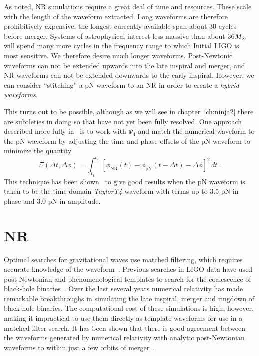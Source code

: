 As noted, NR simulations require a great deal of time and resources.
These scale with the length of the waveform extracted.  Long waveforms
are therefore prohibitively expensive; the longest currently available
span about 30 cycles before merger.  Systems of astrophysical interest
less massive than about $36 M_\odot$ will spend many more cycles in the
frequency range to which Initial LIGO is most sensitive.  We therefore
desire much longer waveforms.  Post-Newtonic waveforms can not be
extended upwards into the late inspiral and merger, and NR waveforms
can not be extended downwards to the early inspiral.  However, we can
consider ``stitching'' a pN waveform to an NR in order to create a
\emph{hybrid waveforms}.

This turns out to be possible, although as we will see in
chapter~\ref{ch:ninja2} there are subtleties in doing so that have not
yet been fully resolved.  One approach described more fully
in~\cite{Boyle2008a} is to work with $\Psi_4$ and match the numerical
waveform to the pN waveform by adjusting the time and phase offsets of
the pN waveform to minimize the quantity
%
\begin{equation}
  \label{eq:MatchingChiSquared}
  \Xi(\Delta t, \Delta \phi) = \int_{t_{1}}^{t_{2}}\, \left[
    \phi_{\mathrm{NR}}(t) - \phi_{\mathrm{pN}}(t - \Delta t) - \Delta \phi
  \right]^{2}\, d t \ .
\end{equation}
%
This technique has been shown~\cite{Boyle2007} to give good results
when the pN waveform is taken to be the time-domain \textit{TaylorT4}
waveform with terms up to 3.5-pN in phase and 3.0-pN in amplitude.


\iffalse

\section{NR}
\label{sec:NR}

Optimal searches for gravitational waves use matched filtering, which
requires accurate knowledge of the waveform~\cite{thorne.k:1987}.
Previous searches in LIGO data have used post-Newtonian and
phenomenological templates to search for the coalescence of black-hole
binaries~\cite{Abbott:2005pf,Abbott:2007xi,Abbott:2008}. Over the last
several years numerical relativity has made remarkable breakthroughs
in simulating the late inspiral, merger and ringdown of black-hole
binaries. The computational cost of these simulations is high,
however, making it impractical to use them directly as template
waveforms for use in a matched-filter search. It has been shown that
there is good agreement between the waveforms generated by numerical
relativity with analytic post-Newtonian waveforms to within just a few
orbits of merger~\cite{Buonanno-Cook-Pretorius:2007, Baker2006d,
  Pan2007, Buonanno2007, Hannam2007, Boyle2007, Gopakumar:2007vh,
  Hannam2007c, Boyle2008a, Mroue2008, Hinder2008b}.


